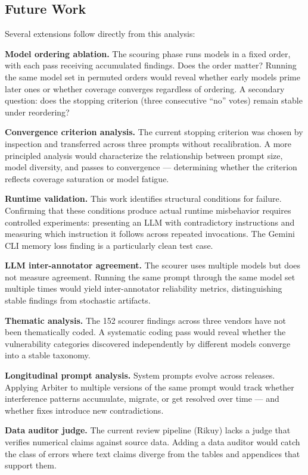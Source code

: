 \subsection{Future Work}

Several extensions follow directly from this analysis:

\textbf{Model ordering ablation.} The scouring phase runs models in a
fixed order, with each pass receiving accumulated findings. Does the
order matter? Running the same model set in permuted orders would reveal
whether early models prime later ones or whether coverage converges
regardless of ordering. A secondary question: does the stopping
criterion (three consecutive ``no'' votes) remain stable under
reordering?

\textbf{Convergence criterion analysis.} The current stopping criterion
was chosen by inspection and transferred across three prompts without
recalibration. A more principled analysis would characterize the
relationship between prompt size, model diversity, and passes to
convergence --- determining whether the criterion reflects coverage
saturation or model fatigue.

\textbf{Runtime validation.} This work identifies structural conditions
for failure. Confirming that these conditions produce actual runtime
misbehavior requires controlled experiments: presenting an LLM with
contradictory instructions and measuring which instruction it follows
across repeated invocations. The Gemini CLI memory loss finding is a
particularly clean test case.

\textbf{LLM inter-annotator agreement.} The scourer uses multiple models
but does not measure agreement. Running the same prompt through the same
model set multiple times would yield inter-annotator reliability
metrics, distinguishing stable findings from stochastic artifacts.

\textbf{Thematic analysis.} The 152 scourer findings across three
vendors have not been thematically coded. A systematic coding pass would
reveal whether the vulnerability categories discovered independently by
different models converge into a stable taxonomy.

\textbf{Longitudinal prompt analysis.} System prompts evolve across
releases. Applying Arbiter to multiple versions of the same prompt would
track whether interference patterns accumulate, migrate, or get resolved
over time --- and whether fixes introduce new contradictions.

\textbf{Data auditor judge.} The current review pipeline (Rikuy) lacks a
judge that verifies numerical claims against source data. Adding a data
auditor would catch the class of errors where text claims diverge from
the tables and appendices that support them.
